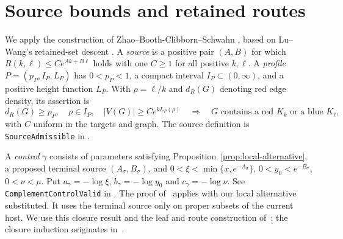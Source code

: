 \section{Source bounds and retained routes}
\label{sec:global-construction}

We apply the construction of Zhao--Booth-Clibborn--Schwahn
\cite[Sections~4--5]{ZBS}, based on Lu--Wang's retained-set descent
\cite[Theorem~2]{LW}. A \emph{source} is a positive pair $(A,B)$ for
which $R(k,\ell)\le Ce^{Ak+B\ell}$ holds with one $C\ge1$ for all
positive $k,\ell$. A \emph{profile} $P=(p_P,I_P,L_P)$ has
$0<p_P<1$, a compact interval $I_P\subset(0,\infty)$, and a positive
height function $L_P$. With $\rho=\ell/k$ and $d_R(G)$ denoting red
edge density, its assertion is
\begin{equation}\label{eq:profile}
 d_R(G)\ge p_P,\quad \rho\in I_P,\quad
 |V(G)|\ge Ce^{kL_P(\rho)}
 \quad\Longrightarrow\quad
 G\text{ contains a red }K_k\text{ or a blue }K_\ell,
\end{equation}
with $C$ uniform in the targets and graph. The source definition is
\texttt{SourceAdmissible} in
.

A \emph{control} $\gamma$ consists of parameters satisfying
Proposition~\ref{prop:local-alternative}, a proposed terminal source
$(A_\sigma,B_\sigma)$, and
$0<\xi<\min\{x,e^{-A_\sigma}\}$, $0<y_0<e^{-B_\sigma}$,
$0<\nu<\mu$. Put $a_\gamma=-\log\xi$, $b_\gamma=-\log y_0$ and
$c_\gamma=-\log\nu$.
See \texttt{ComplementControlValid} in
.
The proof of~\cite[Theorem~4.2, Section~4.3]{ZBS} applies with our local
alternative substituted. It uses the terminal source only on proper
subsets of the current host. We use this closure result and the leaf
and route construction of~\cite[Definition~5.4 and Lemma~5.8]{ZBS};
the closure induction originates in~\cite[Lemma~A.1]{LW}.

